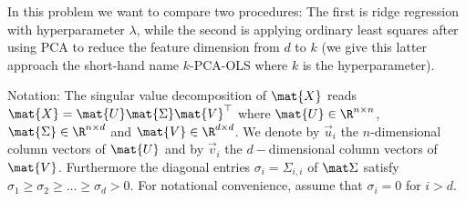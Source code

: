 \documentclass[preview]{standalone}
\begin{document}
In this problem we want to compare two procedures: The first is ridge
regression with hyperparameter $\lambda$, while the second is applying
ordinary least squares after using PCA to reduce the feature dimension
from $d$ to $k$ (we give this latter approach the short-hand name
$k$-PCA-OLS where $k$ is the hyperparameter).


Notation: The singular value decomposition of $\mat{X}$
reads $\mat{X} = \mat{U} \mat{\Sigma} \mat{V}^\top$ where
$\mat{U} \in \R^{n\times n}$, $\mat{\Sigma} \in \R^{n\times d}$ and
$\mat{V} \in \R^{d\times d}$. We denote by $\vec{u}_i$ the
$n$-dimensional column vectors of $\mat{U}$ and by $\vec{v}_i$ the
$d-$dimensional column vectors of $\mat{V}$. Furthermore the diagonal
entries $\sigma_i = \Sigma_{i,i}$ of $\mat \Sigma$ satisfy $\sigma_1
\geq \sigma_2 \geq \dots \geq \sigma_d > 0$. For notational
convenience, assume that $\sigma_i = 0$ for $i > d$.
\end{document}
